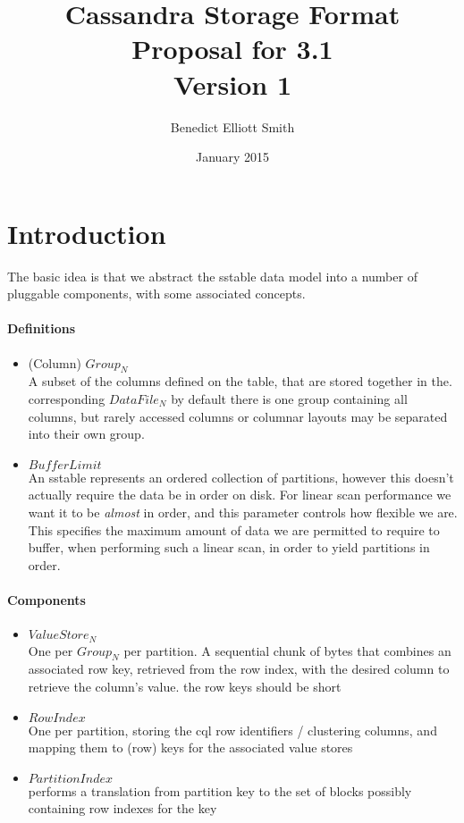 \documentclass[fleqn]{article}
\title{Cassandra Storage Format\\Proposal for 3.1\\Version 1}
\author{Benedict Elliott Smith}
\date{January 2015}
\begin{document}
\maketitle

\scriptsize
\section{Introduction}

The basic idea is that we abstract the sstable data model into a number of pluggable components, 
with some associated concepts.
\\
\paragraph{Definitions}
\begin{itemize}
  \item (Column) $Group_N$\\[2pt]
    A subset of the columns defined on the table, that are stored together in the. 
     corresponding $DataFile_N$ by default there is one group containing all columns, 
     but rarely accessed columns or columnar layouts may be separated into their own group.
  \item $BufferLimit$\\[2pt]
    An sstable represents an ordered collection of partitions, however this doesn't
    actually require the data be in order on disk. For linear scan performance we want it
    to be \emph{almost} in order, and this parameter controls how flexible we are.
    This specifies the maximum amount of data we are permitted to require to buffer, 
    when performing such a linear scan, in order to yield partitions in order.
\end{itemize}

\paragraph{Components}
\begin{itemize}
  \item $ValueStore_N$\\[2pt]
    One per $Group_N$ per partition. A sequential chunk of bytes that combines an associated row
    key, retrieved from the row index, with the desired column to retrieve the column's value.
    the row keys should be short
  \item $RowIndex$\\[2pt]
    One per partition, storing the cql row identifiers / clustering columns, and mapping
    them to (row) keys for the associated value stores 
  \item $PartitionIndex$\\[2pt]
    performs a translation from partition key to the set of blocks possibly containing row indexes for the key 
\end{itemize}
\end{document}
